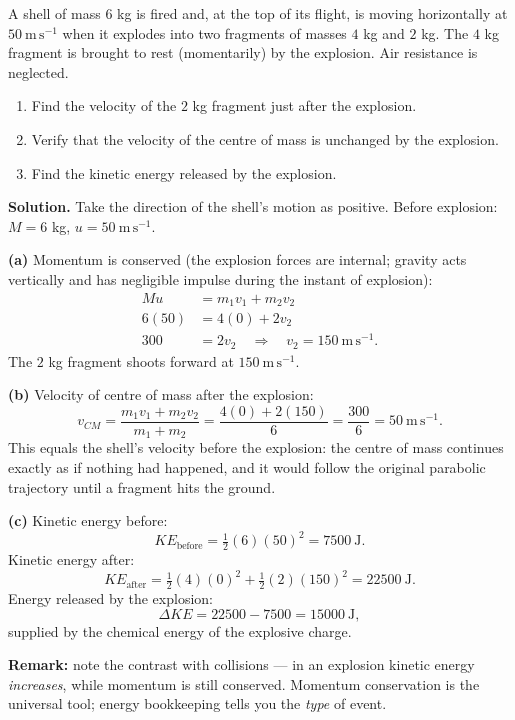 \documentclass[11pt]{article}
\begin{document}
\begin{exoresolu}
A shell of mass $6$ kg is fired and, at the top of its flight, is moving horizontally at $50\ \mathrm{m\,s^{-1}}$ when it explodes into two fragments of masses $4$ kg and $2$ kg. The $4$ kg fragment is brought to rest (momentarily) by the explosion. Air resistance is neglected.
\begin{enumerate}
\item[(a)] Find the velocity of the $2$ kg fragment just after the explosion.
\item[(b)] Verify that the velocity of the centre of mass is unchanged by the explosion.
\item[(c)] Find the kinetic energy released by the explosion.
\end{enumerate}
\tcblower
\textbf{Solution.} Take the direction of the shell's motion as positive. Before explosion: $M=6$ kg, $u=50\ \mathrm{m\,s^{-1}}$.

\textbf{(a)} Momentum is conserved (the explosion forces are internal; gravity acts vertically and has negligible impulse during the instant of explosion):
\begin{align*}
Mu&=m_1v_1+m_2v_2\\
6(50)&=4(0)+2v_2\\
300&=2v_2 \quad\Longrightarrow\quad v_2=150\ \mathrm{m\,s^{-1}}.
\end{align*}
The $2$ kg fragment shoots forward at $150\ \mathrm{m\,s^{-1}}$.

\textbf{(b)} Velocity of centre of mass after the explosion:
\[ v_{CM}=\frac{m_1v_1+m_2v_2}{m_1+m_2}=\frac{4(0)+2(150)}{6}=\frac{300}{6}=50\ \mathrm{m\,s^{-1}}. \]
This equals the shell's velocity before the explosion: the centre of mass continues exactly as if nothing had happened, and it would follow the original parabolic trajectory until a fragment hits the ground.

\textbf{(c)} Kinetic energy before:
\[ KE_{\text{before}}=\tfrac12(6)(50)^2=7500\ \mathrm{J}. \]
Kinetic energy after:
\[ KE_{\text{after}}=\tfrac12(4)(0)^2+\tfrac12(2)(150)^2=22500\ \mathrm{J}. \]
Energy released by the explosion:
\[ \Delta KE=22500-7500=15000\ \mathrm{J}, \]
supplied by the chemical energy of the explosive charge.

\textbf{Remark:} note the contrast with collisions — in an explosion kinetic energy \emph{increases}, while momentum is still conserved. Momentum conservation is the universal tool; energy bookkeeping tells you the \emph{type} of event.
\end{exoresolu}
\end{document}
